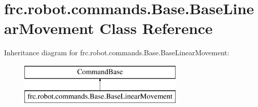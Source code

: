 \hypertarget{classfrc_1_1robot_1_1commands_1_1_base_1_1_base_linear_movement}{}\section{frc.\+robot.\+commands.\+Base.\+Base\+Linear\+Movement Class Reference}
\label{classfrc_1_1robot_1_1commands_1_1_base_1_1_base_linear_movement}
Inheritance diagram for frc.\+robot.\+commands.\+Base.\+Base\+Linear\+Movement\+:\begin{figure}[H]
\begin{center}
\leavevmode
\includegraphics[height=2.000000cm]{classfrc_1_1robot_1_1commands_1_1_base_1_1_base_linear_movement}
\end{center}
\end{figure}
